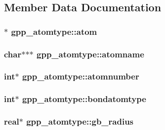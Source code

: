 \subsection{\-Member \-Data \-Documentation}
\hypertarget{structgpp__atomtype_a8d895cc22e3ec26491b790506156fd00}{
\subsubsection[{atom}]{$\ast$ {\bf gpp\-\_\-atomtype\-::atom}}}\label{structgpp__atomtype_a8d895cc22e3ec26491b790506156fd00}
\hypertarget{structgpp__atomtype_ae57b1f0b8cb12a1e29bc6bf12581c513}{
\subsubsection[{atomname}]{\setlength{\rightskip}{0pt plus 5cm}char$\ast$$\ast$$\ast$ {\bf gpp\-\_\-atomtype\-::atomname}}}\label{structgpp__atomtype_ae57b1f0b8cb12a1e29bc6bf12581c513}
\hypertarget{structgpp__atomtype_af05cc2cfbbd4462ff5205d1614663113}{
\subsubsection[{atomnumber}]{\setlength{\rightskip}{0pt plus 5cm}int$\ast$ {\bf gpp\-\_\-atomtype\-::atomnumber}}}\label{structgpp__atomtype_af05cc2cfbbd4462ff5205d1614663113}
\hypertarget{structgpp__atomtype_a0aa2285f55ff4ec5e83472793599dec1}{
\subsubsection[{bondatomtype}]{\setlength{\rightskip}{0pt plus 5cm}int$\ast$ {\bf gpp\-\_\-atomtype\-::bondatomtype}}}\label{structgpp__atomtype_a0aa2285f55ff4ec5e83472793599dec1}
\hypertarget{structgpp__atomtype_ab65fd20f1bb906e269d41dabac02ec53}{
\subsubsection[{gb\-\_\-radius}]{\setlength{\rightskip}{0pt plus 5cm}real$\ast$ {\bf gpp\-\_\-atomtype\-::gb\-\_\-radius}}}\label{structgpp__atomtype_ab65fd20f1bb906e269d41dabac02ec53}
